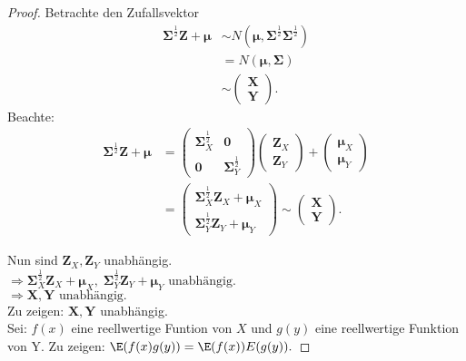 \documentclass{tstextbook}
\begin{document}
\begin{proof}
Betrachte den Zufallsvektor 
	\begin{align*}
	\mathbf{ \Sigma}^{\frac{1}{2}} \mathbf{Z} + \boldsymbol{\mu} & \sim N\left(\boldsymbol{\mu} , \boldsymbol{\Sigma}^{\frac{1}{2}} \boldsymbol{\Sigma}^{\frac{1}{2}} \right) \\ 
	& = 
	N\left(\boldsymbol{\mu} , \boldsymbol{\Sigma} \right) \\
	& \sim 
	\begin{pmatrix}
		\mathbf{X} \\ \mathbf{Y}
	\end{pmatrix}. 
\end{align*}
	Beachte:
	\begin{align*}
		\boldsymbol{\Sigma}^{\frac{1}{2}} \mathbf{Z} + \boldsymbol{\mu} & = \begin{pmatrix}
			\boldsymbol{\Sigma}_X^{\frac{1}{2}} & \boldsymbol{0} \\
			\boldsymbol{0} & \boldsymbol{\Sigma}_Y^{\frac{1}{2}}
		\end{pmatrix} \begin{pmatrix} \mathbf{Z}_X \\ \mathbf{Z}_Y \end{pmatrix} + \begin{pmatrix} \boldsymbol{\mu}_X \\ \boldsymbol{\mu}_Y \end{pmatrix}\\
	& = \begin{pmatrix}
		\boldsymbol{\Sigma}_X^{\frac{1}{2}} \mathbf{Z}_X + \boldsymbol{\mu}_X \\
		\boldsymbol{\Sigma}_Y^{\frac{1}{2}} \mathbf{Z}_Y + \boldsymbol{\mu}_Y
	\end{pmatrix} \sim \begin{pmatrix}
	\mathbf{X} \\ \mathbf{Y} \end{pmatrix}.
	\end{align*}

Nun sind $ \mathbf{Z}_X, \mathbf{Z}_Y $ unabhängig. \\
$ \Rightarrow \boldsymbol{\Sigma}_X^{\frac{1}{2}} \mathbf{Z}_X + \boldsymbol{\mu}_X, \; \boldsymbol{\Sigma}_Y^{\frac{1}{2}} \mathbf{Z}_Y + \boldsymbol{\mu}_Y \text{ unabhängig}. $ \\
$ \Rightarrow \mathbf{X},\mathbf{Y} \text{ unabhängig}. $ \\
Zu zeigen: $ \mathbf{X}, \mathbf{Y} $ unabhängig. \\
Sei: $ f(x) $ eine reellwertige Funtion von $ X $ und $ g(y) $ eine reellwertige Funktion von Y.
Zu zeigen: $ \E(f(x)g(y)) = \E(f(x))E(g(y)). $


\end{proof}
\end{document}
